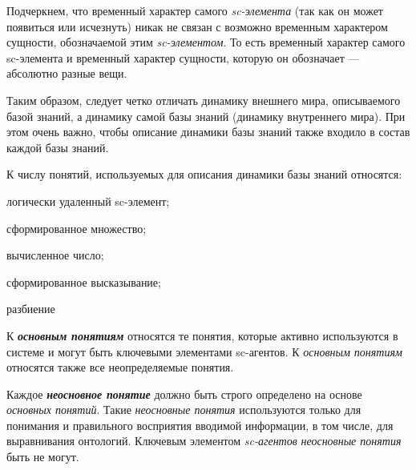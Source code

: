 \begin{SCn}
\begin{SCn}
Подчеркнем, что временный характер самого \textit{sc-элемента} (так как он может появиться или исчезнуть) никак не связан с возможно временным характером сущности, обозначаемой этим \textit{sc-элементом}. То есть временный характер самого sc-элемента и временный характер сущности, которую он обозначает --- абсолютно разные вещи.

Таким образом, следует четко отличать динамику внешнего мира, описываемого базой знаний, а динамику самой базы знаний (динамику внутреннего мира). При этом очень важно, чтобы описание динамики базы знаний также входило в состав каждой базы знаний.

К числу понятий, используемых для описания динамики базы знаний относятся:
\begin{textitemize}
	\item логически удаленный sc-элемент;
	\item сформированное множество;
	\item вычисленное число;
	\item сформированное высказывание;
\end{textitemize}

\begin{SCn}
\begin{scnrelfromset}{разбиение}
\end{scnrelfromset}




\end{SCn}

К \textbf{\textit{основным понятиям}} относятся те понятия, которые активно используются в системе и могут быть ключевыми элементами sc-агентов. К \textit{основным понятиям} относятся также все неопределяемые понятия.

\begin{SCn}
\end{SCn}

Каждое \textbf{\textit{неосновное понятие}} должно быть строго определено на основе \textit{основных понятий}. Такие \textit{неосновные понятия} используются только для понимания и правильного восприятия вводимой информации, в том числе, для выравнивания онтологий. Ключевым элементом \textit{sc-агентов} \textit{неосновные понятия} быть не могут.


\end{SCn}
\end{SCn}
